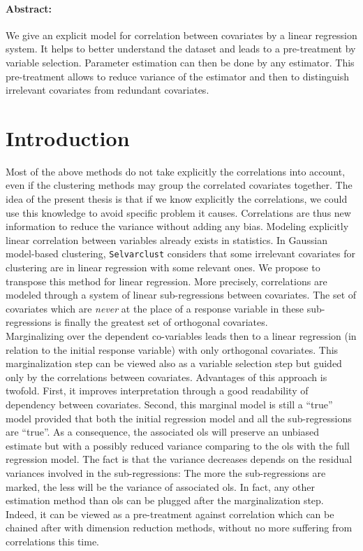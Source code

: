 \documentclass[12pt,a4paper]{report}
\begin{document}
\paragraph{Abstract:} 
We give an explicit model for correlation between covariates by a linear regression system. It helps to better understand the dataset and leads to a pre-treatment by variable selection. Parameter estimation can then be done by any estimator. This pre-treatment allows to reduce variance of the estimator and then to distinguish irrelevant covariates from redundant covariates.
\\
\section{Introduction}
Most of the above methods do not take explicitly the correlations into account, even if the clustering methods may group the correlated covariates together.
The idea of the present thesis is that if we know explicitly the correlations, we could use this knowledge to avoid specific problem it causes. Correlations are thus new information to reduce the variance without adding any bias. 
Modeling explicitly linear correlation between variables already exists in statistics. In Gaussian model-based clustering, {\tt Selvarclust} \cite{maugis2009variable} considers that some irrelevant covariates for clustering are in linear regression with some relevant ones.
 We propose to transpose this method for linear regression.
More precisely, correlations are modeled through a system of linear sub-regressions between covariates. The set of covariates which are {\it never} at the place of a response variable in these sub-regressions is finally the greatest set of orthogonal covariates.\\

 Marginalizing over the dependent co-variables leads then to a linear regression (in relation to the initial response variable) with only orthogonal covariates. This marginalization step can be viewed also as a variable selection step but guided only by the correlations between covariates. Advantages of this approach is twofold. First, it improves interpretation through a good readability of dependency between covariates. Second, this marginal model is still a ``true'' model provided that both the initial regression model and all the sub-regressions are ``true''. As a consequence, the associated {\sc ols} will preserve an unbiased estimate but with a possibly reduced variance comparing to the {\sc ols} with the full regression model. The fact is that the variance decreases depends on the residual variances involved in the sub-regressions: The more the sub-regressions are marked, the less will be the variance of associated {\sc ols}. In fact, any other estimation method than {\sc ols} can be plugged after the marginalization step. Indeed, it can be viewed as a pre-treatment against correlation which can be chained after with dimension reduction methods, without no more suffering from correlations this time.
\end{document}
